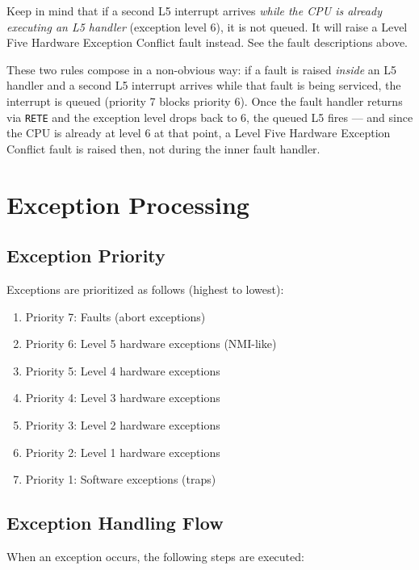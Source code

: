 Keep in mind that if a second L5 interrupt arrives \textit{while the CPU is already executing an L5 handler}
(exception level 6), it is not queued. It will raise a Level Five Hardware Exception Conflict fault instead.
See the fault descriptions above.

These two rules compose in a non-obvious way: if a fault is raised \textit{inside} an L5 handler and a second L5
interrupt arrives while that fault is being serviced, the interrupt is queued (priority 7 blocks priority 6). Once
the fault handler returns via \texttt{RETE} and the exception level drops back to 6, the queued L5 fires — and
since the CPU is already at level 6 at that point, a Level Five Hardware Exception Conflict fault is raised then,
not during the inner fault handler.

\section{Exception Processing}

\subsection{Exception Priority}

Exceptions are prioritized as follows (highest to lowest):

\begin{enumerate}
	\item Priority 7: Faults (abort exceptions)
	\item Priority 6: Level 5 hardware exceptions (NMI-like)
	\item Priority 5: Level 4 hardware exceptions
	\item Priority 4: Level 3 hardware exceptions
	\item Priority 3: Level 2 hardware exceptions
	\item Priority 2: Level 1 hardware exceptions
	\item Priority 1: Software exceptions (traps)
\end{enumerate}

\subsection{Exception Handling Flow}

When an exception occurs, the following steps are executed:

